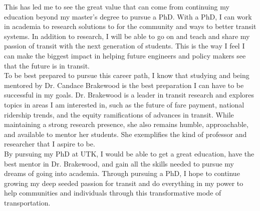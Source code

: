 \documentclass{resume} %
\begin{document}
This has led me to see the great value that can come from continuing my education beyond my master’s degree to pursue a PhD. With a PhD, I can work in academia to research solutions to for the community and ways to better transit systems. In addition to research, I will be able to go on and teach and share my passion of transit with the next generation of students. This is the way I feel I can make the biggest impact in helping future engineers and policy makers see that the future is in transit. \\

To be best prepared to pursue this career path, I know that studying and being mentored by Dr. Candace Brakewood is the best preparation I can have to be successful in my goals. Dr. Brakewood is a leader in transit research and explores topics in areas I am interested in, such as the future of fare payment, national ridership trends, and the equity ramifications of advances in transit. While maintaining a strong research presence, she also remains humble, approachable, and available to mentor her students. She exemplifies the kind of professor and researcher that I aspire to be. \\ 

By pursuing my PhD at UTK, I would be able to get a great education, have the best mentor in Dr. Brakewood, and gain all the skills needed to pursue my dreams of going into academia. Through pursuing a PhD, I hope to continue growing my deep seeded passion for transit and do everything in my power to help communities and individuals through this transformative mode of transportation. \\
\end{document}
